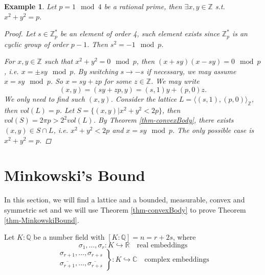 \documentclass[11pt]{book}
\newtheorem{example}[theorem]{Example}
\begin{document}
\begin{example}
    Let $p=1 \mod 4$ be a rational prime, then $\exists x,y\in \mathbb{Z}$ s.t. $x^{2}+y^{2}=p$. 
    \begin{proof}
        Let $s\in \mathbb{Z}_{p}^{*}$ be an element of order 4, such element exists since $\mathbb{Z}_{p}^{*}$ is an cyclic group of order $p-1$. Then $s^{2}=-1 \mod p$. 

        For $x,y \in \mathbb{Z}$ such that $x^{2}+y^{2}=0 \mod p$, then $(x+sy)(x-sy)=0\mod p$, i.e. $x=\pm sy\mod p$. By switching $s\to -s$ if necessary, we may assume $x=sy\mod p$. So $x=sy+zp$ for some $z\in \mathbb{Z}$. We may write 
        \[
        (x,y)=(sy+zp,y)=(s,1)y+(p,0)z. 
        \]
        We only need to find such $(x,y)$. 
        Consider the lattice $L=\langle (s,1),(p,0)\rangle_{\mathbb{Z}}$, then $vol(L)=p$. Let $S=\{(x,y)|x^{2}+y^{2}<2p\}$, then $vol(S)=2\pi p>2^{2}vol(L)$. By Theorem \ref{thm-convexBody}, there exists $(x,y)\in S\cap L$, i.e. $x^{2}+y^{2}<2p$ and $x=sy\mod p$. The only possible case is $x^{2}+y^{2}=p$. 
    \end{proof}
\end{example}

\section{Minkowski's Bound}
In this section, we will find a lattice and a bounded, measurable, convex and symmetric set and we will use Theorem \ref{thm-convexBody} to prove Theorem \ref{thm-MinkowskiBound}. 

Let $K:\mathbb{Q}$ be a number field with $[K:\mathbb{Q}]=n=r+2s$, where 
\[
\sigma_{1},\dots, \sigma_{r}:K\hookrightarrow\mathbb{R} \quad\text{real embeddings}
\]
\[
\left.\begin{aligned}
    \sigma_{r+1},\dots, \sigma_{r+s}\\
    \overline{\sigma_{r+1}},\dots, \overline{\sigma_{r+s}}
\end{aligned}\right\}:K\hookrightarrow \mathbb{C}\quad \text{complex embeddings}
\]
\end{document}
